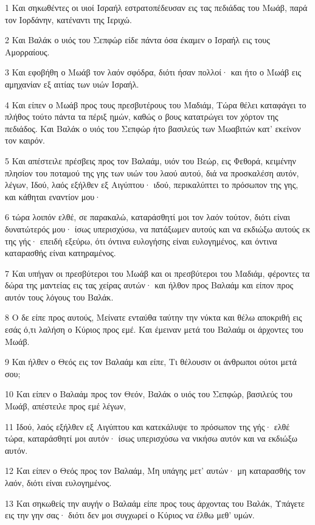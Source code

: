 \par 1 Και σηκωθέντες οι υιοί Ισραήλ εστρατοπέδευσαν εις τας πεδιάδας του Μωάβ, παρά τον Ιορδάνην, κατέναντι της Ιεριχώ.
\par 2 Και Βαλάκ ο υιός του Σεπφώρ είδε πάντα όσα έκαμεν ο Ισραήλ εις τους Αμορραίους.
\par 3 Και εφοβήθη ο Μωάβ τον λαόν σφόδρα, διότι ήσαν πολλοί· και ήτο ο Μωάβ εις αμηχανίαν εξ αιτίας των υιών Ισραήλ.
\par 4 Και είπεν ο Μωάβ προς τους πρεσβυτέρους του Μαδιάμ, Τώρα θέλει καταφάγει το πλήθος τούτο πάντα τα πέριξ ημών, καθώς ο βους κατατρώγει τον χόρτον της πεδιάδος. Και Βαλάκ ο υιός του Σεπφώρ ήτο βασιλεύς των Μωαβιτών κατ' εκείνον τον καιρόν.
\par 5 Και απέστειλε πρέσβεις προς τον Βαλαάμ, υιόν του Βεώρ, εις Φεθορά, κειμένην πλησίον του ποταμού της γης των υιών του λαού αυτού, διά να προσκαλέση αυτόν, λέγων, Ιδού, λαός εξήλθεν εξ Αιγύπτου· ιδού, περικαλύπτει το πρόσωπον της γης, και κάθηται εναντίον μου·
\par 6 τώρα λοιπόν ελθέ, σε παρακαλώ, καταράσθητί μοι τον λαόν τούτον, διότι είναι δυνατώτερός μου· ίσως υπερισχύσω, να πατάξωμεν αυτούς και να εκδιώξω αυτούς εκ της γής· επειδή εξεύρω, ότι όντινα ευλογήσης είναι ευλογημένος, και όντινα καταρασθής είναι κατηραμένος.
\par 7 Και υπήγαν οι πρεσβύτεροι του Μωάβ και οι πρεσβύτεροι του Μαδιάμ, φέροντες τα δώρα της μαντείας εις τας χείρας αυτών· και ήλθον προς Βαλαάμ και είπον προς αυτόν τους λόγους του Βαλάκ.
\par 8 Ο δε είπε προς αυτούς, Μείνατε ενταύθα ταύτην την νύκτα και θέλω αποκριθή εις εσάς ό,τι λαλήση ο Κύριος προς εμέ. Και έμειναν μετά του Βαλαάμ οι άρχοντες του Μωάβ.
\par 9 Και ήλθεν ο Θεός εις τον Βαλαάμ και είπε, Τι θέλουσιν οι άνθρωποι ούτοι μετά σου;
\par 10 Και είπεν ο Βαλαάμ προς τον Θεόν, Βαλάκ ο υιός του Σεπφώρ, βασιλεύς του Μωάβ, απέστειλε προς εμέ λέγων,
\par 11 Ιδού, λαός εξήλθεν εξ Αιγύπτου και κατεκάλυψε το πρόσωπον της γής· ελθέ τώρα, καταράσθητί μοι αυτόν· ίσως υπερισχύσω να νικήσω αυτόν και να εκδιώξω αυτόν.
\par 12 Και είπεν ο Θεός προς τον Βαλαάμ, Μη υπάγης μετ' αυτών· μη καταρασθής τον λαόν, διότι είναι ευλογημένος.
\par 13 Και σηκωθείς την αυγήν ο Βαλαάμ είπε προς τους άρχοντας του Βαλάκ, Υπάγετε εις την γην σας· διότι δεν μοι συγχωρεί ο Κύριος να έλθω μεθ' υμών.
